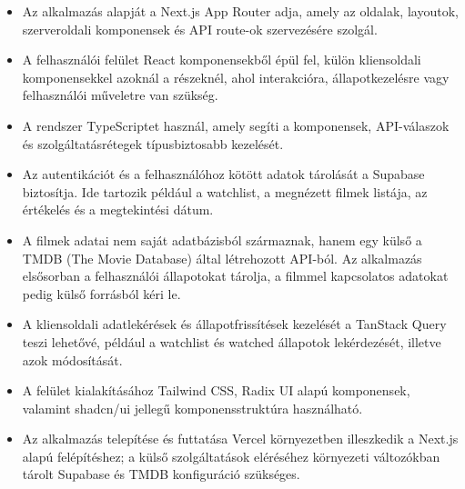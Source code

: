 \begin{itemize}
    \item Az alkalmazás alapját a Next.js App Router adja, amely az oldalak, layoutok, szerveroldali komponensek és API route-ok szervezésére szolgál.
    \item A felhasználói felület React komponensekből épül fel, külön kliensoldali komponensekkel azoknál a részeknél, ahol interakcióra, állapotkezelésre vagy felhasználói műveletre van szükség.
    \item A rendszer TypeScriptet használ, amely segíti a komponensek, API-válaszok és szolgáltatásrétegek típusbiztosabb kezelését.
    \item Az autentikációt és a felhasználóhoz kötött adatok tárolását a Supabase biztosítja. Ide tartozik például a watchlist, a megnézett filmek listája, az értékelés és a megtekintési dátum.
    \item A filmek adatai nem saját adatbázisból származnak, hanem egy külső a TMDB (The Movie Database) által létrehozott API-ból. Az alkalmazás elsősorban a felhasználói állapotokat tárolja, a filmmel kapcsolatos adatokat pedig külső forrásból kéri le.
    \item A kliensoldali adatlekérések és állapotfrissítések kezelését a TanStack Query teszi lehetővé, például a watchlist és watched állapotok lekérdezését, illetve azok módosítását.
    \item A felület kialakításához Tailwind CSS, Radix UI alapú komponensek, valamint shadcn/ui jellegű komponensstruktúra használható.
    \item Az alkalmazás telepítése és futtatása Vercel környezetben illeszkedik a Next.js alapú felépítéshez; a külső szolgáltatások eléréséhez környezeti változókban tárolt Supabase és TMDB konfiguráció szükséges.
\end{itemize}
